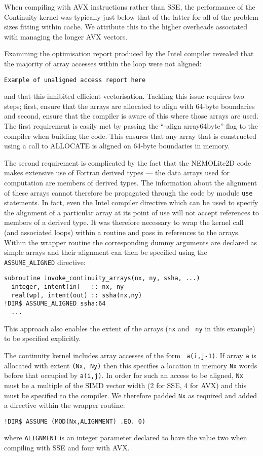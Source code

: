 \documentclass[12pt]{article}
\begin{document}
When compiling with AVX instructions rather than SSE, the performance
of the Continuity kernel was typically just below that of the latter
for all of the problem sizes fitting within cache. We attribute this
to the higher overheads associated with managing the longer AVX
vectors.

Examining the optimisation report produced by the Intel compiler
revealed that the majority of array accesses within the loop were not
aligned:
\begin{verbatim}
Example of unaligned access report here
\end{verbatim}
and that this inhibited efficient vectorisation. Tackling this issue
requires two steps; first, ensure that the arrays are allocated to
align with 64-byte boundaries and second, ensure that the compiler is
aware of this where those arrays are used. The first requirement is
easily met by passing the ``-align array64byte'' flag to
the compiler when building the code. This ensures that any array that
is constructed using a call to ALLOCATE is aligned on 64-byte
boundaries in memory.

The second requirement is complicated by the fact that the NEMOLite2D
code makes extensive use of Fortran derived types --- the data arrays
used for computation are members of derived types. The information
about the alignment of these arrays cannot therefore be propagated
through the code by module {\tt use} statements. In fact, even the
Intel compiler directive which can be used to specify the alignment
of a particular array at its point of use will not accept references
to members of a derived type. It was therefore necessary to wrap the
kernel call (and associated loops) within a routine and pass in
references to the arrays. Within the wrapper routine the corresponding
dummy arguments are declared as simple arrays and their alignment can
then be specified using the {\tt ASSUME\_ALIGNED} directive:
\begin{verbatim}
subroutine invoke_continuity_arrays(nx, ny, ssha, ...)
  integer, intent(in)   :: nx, ny
  real(wp), intent(out) :: ssha(nx,ny)
!DIR$ ASSUME_ALIGNED ssha:64
  ...
\end{verbatim}
This approach also enables the extent of the arrays ({\tt nx} and {\tt
  ny} in this example) to be specified explicitly.

The continuity kernel includes array accesses of the form {\tt
  a(i,j-1)}. If array {\tt a} is allocated with extent {\tt (Nx, Ny)}
then this specifies a location in memory {\tt Nx} words before that
occupied by {\tt a(i,j)}. In order for such an access to be aligned,
{\tt Nx} must be a multiple of the SIMD vector width (2 for SSE, 4 for
AVX) and this must be specified to the compiler. We therefore padded {\tt Nx}
as required and added a directive within the wrapper routine:
\begin{verbatim}
!DIR$ ASSUME (MOD(Nx,ALIGNMENT) .EQ. 0)
\end{verbatim}
where {\tt ALIGNMENT} is an integer parameter declared to have the value two
when compiling with SSE and four with AVX.
\end{document}
